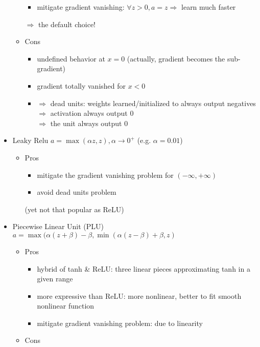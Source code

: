 \begin{itemize}
\begin{itemize}
\begin{itemize}
		\item mitigate gradient vanishing: $\forall z>0, a=z \Rightarrow$ learn much faster
		\end{itemize}
		$\Rightarrow$ the default choice!
	\item Cons
		\begin{itemize}
		\item undefined behavior at $x=0$ (actually, gradient becomes the sub-gradient)
		\item gradient totally vanished for $x<0$
		\item $\Rightarrow$ dead units: weights learned/initialized to always output negatives \\ 
		$\Rightarrow$ activation always output $0$ \\
		$\Rightarrow$ the unit always output $0$
		\end{itemize}		
	\end{itemize}
\item Leaky Relu $a=\max(\alpha z, z), \alpha \rightarrow 0^+$ (e.g. $\alpha=0.01$)
	\begin{itemize}
	\item Pros
		\begin{itemize}
		\item mitigate the gradient vanishing problem for $(-\infty, +\infty)$
		\item avoid dead units problem
		\end{itemize}
		(yet not that popular as ReLU)
	\end{itemize}

\item Piecewise Linear Unit (PLU) $a=\max(\alpha(z+\beta)-\beta, \min(\alpha(z-\beta)+\beta, z)$
	\begin{itemize}
	\item Pros
		\begin{itemize}
		\item hybrid of tanh \& ReLU: three linear pieces approximating tanh in a given range
		\item more expressive than ReLU: more nonlinear, better to fit smooth nonlinear function
		\item mitigate gradient vanishing problem: due to linearity
		\end{itemize}
	\item Cons
	\end{itemize}


\end{itemize}
